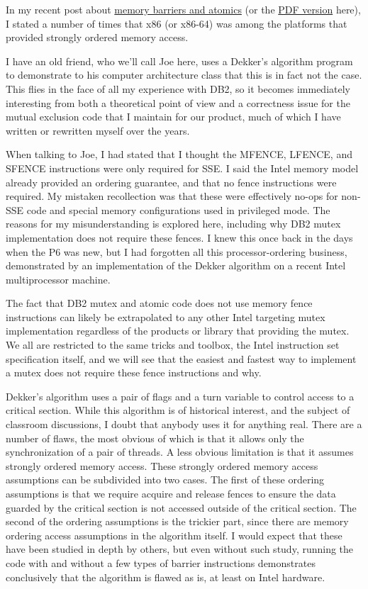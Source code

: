 In my recent post about \href{http://wp.me/ppf39-c1}{memory barriers and atomics} (or the \href{http://sites.google.com/site/peeterjoot/math2009/atomic.pdf?revision=1}{PDF version} here), I stated a number of times that x86 (or x86-64) was among the platforms that provided strongly ordered memory access.

I have an old friend, who we'll call Joe here, uses a Dekker's algorithm program to demonstrate to his computer architecture class that this is in fact not the case.  This flies in the face of all my experience with DB2, so it becomes immediately interesting from both a theoretical point of view and a correctness issue for the mutual exclusion code that I maintain for our product, much of which I have written or rewritten myself over the years.

When talking to Joe, I had stated that I thought the MFENCE, LFENCE, and SFENCE instructions were only required for SSE.  I said the Intel memory model already provided an ordering guarantee, and that no fence instructions were required.  My mistaken recollection was that these were effectively no-ops for non-SSE code and special memory configurations used in privileged mode.
The reasons for my misunderstanding is explored here, including why DB2 mutex implementation does not require these fences.  I knew this once back in the days when the P6 was new, but I had forgotten all this processor-ordering business, demonstrated by an implementation of the Dekker algorithm on a recent Intel multiprocessor machine.

The fact that DB2 mutex and atomic code does not use memory fence instructions can likely be extrapolated to any other Intel targeting mutex implementation regardless of the products or library that providing the mutex.  We all are restricted to the same tricks and toolbox, the Intel instruction set specification itself, and we will see that the easiest and fastest way to implement a mutex does not require these fence instructions and why.

Dekker's algorithm uses a pair of flags and a turn variable to control access to a critical section.  While this algorithm is of historical interest, and the subject of classroom discussions, I doubt that anybody uses it for anything real.  There are a number of flaws, the most obvious of which is that it allows only the synchronization of a pair of threads.  A less obvious limitation is that it assumes strongly ordered memory access.  These strongly ordered memory access assumptions can be subdivided into two cases.  The first of these ordering assumptions is that we require acquire and release fences to ensure the data guarded by the critical section is not accessed outside of the critical section.  The second of the ordering assumptions is the trickier part, since there are memory ordering access assumptions in the algorithm itself.  I would expect that these have been studied in depth by others, but even without such study, running the code with and without a few types of barrier instructions demonstrates conclusively that the algorithm is flawed as is, at least on Intel hardware.

